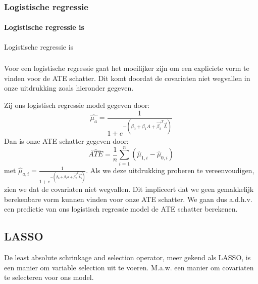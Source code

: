 \documentclass[12pt, a4paper, faculty=we]{ugent-doc}
\begin{document}
\subsubsection{Logistische regressie}
\paragraph[Wat is logistische regressie?]{Logistische regressie is}
Logistische regressie is


\begin{flushleft}
    
\end{flushleft}

\subsubsection{}

\begin{flushleft}
    Voor een logistische regressie gaat het moeilijker zijn om een expliciete vorm
    te vinden voor de ATE schatter. Dit komt doordat de covariaten niet wegvallen in onze uitdrukking
    zoals hieronder gegeven.
\end{flushleft}
\begin{flushleft}
    Zij ons logistisch regressie model gegeven door:
    \[
        \hat{\mu_a} = \frac{1}{1 + e^{-(\beta_0 + \beta_1 A + \vec{\beta_2}^T \vec{L})}}
    \]
    Dan is onze ATE schatter gegeven door:
    \begin{equation}
        \hat{ATE} = \frac{1}{n} \sum_{i=1}^{n} \left( \hat{\mu}_{1,i} - \hat{\mu}_{0,i} \right)
    \end{equation}
    met \(\hat{\mu}_{a,i} = \frac{1}{1 + e^{-(\beta_0 + \beta_1 a + \vec{\beta_2}^T \vec{L_i})}}\).
    \newline \hfill \break
    Als we deze uitdrukking proberen te vereenvoudigen, zien we dat de covariaten niet wegvallen.
    Dit impliceert dat we geen gemakkelijk berekenbare vorm kunnen vinden voor onze ATE schatter.
    We gaan dus a.d.h.v. een predictie van ons logistisch regressie model de ATE schatter berekenen.
\end{flushleft}


\subsection{LASSO}

\begin{flushleft}
    De least absolute schrinkage and selection operator, meer gekend als LASSO, is een manier om variable selection
    uit te voeren. M.a.w. een manier om covariaten te selecteren voor ons model.
\end{flushleft}
\end{document}
